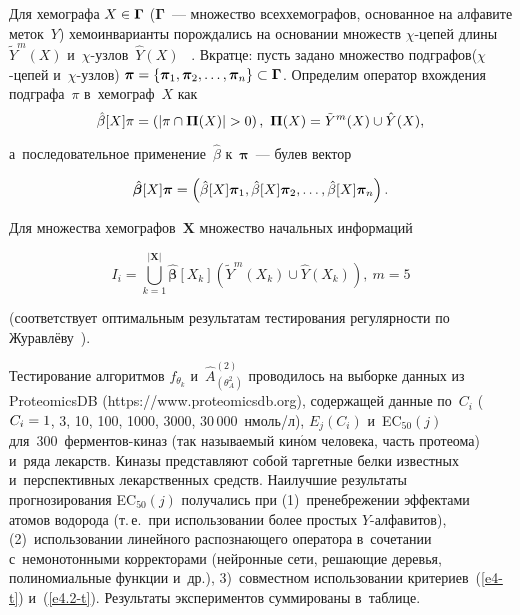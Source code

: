 \begin{multicols}{2}
     
     Для хемографа $X\hm\in \bm{\Gamma}$ ($\bm{\Gamma}$~--- множество 
всех\linebreak хемографов, основанное на алфавите меток~$Y$) хемоинварианты 
порождались на основании множеств  
$\chi$-це\-пей длины $\tilde{{Y}}^m(X)$ и~$\chi$-уз\-лов~$\hat{Y}(X)$  ~\cite{6-t}. 
Вкратце: пусть задано множество подграфов\linebreak ($\chi$-це\-пей и~$\chi$-уз\-лов) 
$\bm{\pi}\hm= \{ \bm{\pi}_1, \bm{\pi}_2, \ldots, \bm{\pi}_n\} \hm\subset 
\bm{\Gamma}$. Определим оператор вхождения подграфа~$\pi$ 
в~хемограф~$X$ как 
$$
\hat{\beta}[X]\pi\hm= \left( \vert \pi \cap \bm{\Pi}(X)\vert 
>0\right),\ \bm{\Pi}(X)\hm= \tilde{{Y}}^m (X)\cup 
\hat{{Y}}(X),
$$

\vspace*{-12pt}

\columnbreak

\noindent
 а~последовательное применение~$\hat{\beta}$ 
к~$\bm{\pi}$~--- булев \mbox{вектор }

\noindent
$$
\hat{\bm{\beta}}[X]\bm{\pi} \hm= \left( 
\hat{\beta}[X]\bm{\pi}_1, \hat{\beta}[X]\bm{\pi}_2, \ldots , 
\hat{\beta}[X]\bm{\pi}_n\right).
$$

\vspace*{-3.5pt}

\noindent
 Для множества хемографов~$\mathbf{X}$ 
множество начальных информаций 

\vspace*{1pt}

\noindent
$$
I_i= \mathop{\bigcup}\limits_{k=1}^{\vert \mathbf{X}\vert} 
\hat{\bm{\beta}}[X_k]\left( \tilde{{Y}}^m(X_k) \cup 
\hat{{Y}}(X_k)\right),\ m=5
$$

\vspace*{-3.5pt}

\noindent
 (соответствует оптимальным 
результатам тестирования регулярности по Журавлёву~\cite{6-t}).
     
     Тестирование алгоритмов $f_{\theta_k}$ и~$\hat{{A}}^{(2)}_{(\theta^2_A)}$ проводилось на выборке данных из 
ProteomicsDB ({\sf https://www.proteomicsdb.org}), содержащей данные 
по~$C_i$ ($C_i\hm=1$, 3, 10, 100, 1000, 3000, 30\,000~нмоль/л), $E_j(C_i)$ 
и~EC$_{50} (j)$ для~300~фер\-мен\-тов-ки\-наз (так называемый 
кин$\acute{\mbox{о}}$м человека, часть протеома) и~ряда лекарств. Киназы 
представляют собой таргетные белки известных и~перспективных 
лекарственных средств. Наилучшие результаты прогнозирования EC$_{50} (j)$ 
получались при (1)~пренебрежении эффектами атомов водорода (т.\,е.\ при 
использовании более простых $Y$-ал\-фа\-ви\-тов), (2)~использовании линейного 
распознающего оператора в~сочетании с~немонотонными корректорами 
(нейронные сети, решающие деревья, полиномиальные функции и~др.), 
3)~совместном использовании критериев~(\ref{e4-t}) и~(\ref{e4.2-t}). 
Результаты экспериментов суммированы в~таблице.
     



\end{multicols}

